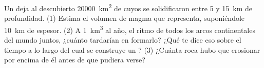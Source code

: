 \begin{exercise}[$\star\star\star$]\label{exo:g12:subduction-magmatism:15}
Un  deja al descubierto \qty{20000}{km^2} de  cuyos
 se solidificaron entre 5 y \qty{15}{km} de profundidad. (1) Estima
el volumen de magma que representa, suponiéndole \qty{10}{km} de espesor.
(2) A \qty{1}{km^3} al año, el ritmo de todos los arcos continentales del
mundo juntos, ¿cuánto tardarían en formarlo? ¿Qué te dice eso sobre el tiempo
a lo largo del cual se construye un ?
(3) ¿Cuánta roca hubo que erosionar por encima de él antes de que pudiera verse?
\end{exercise}

